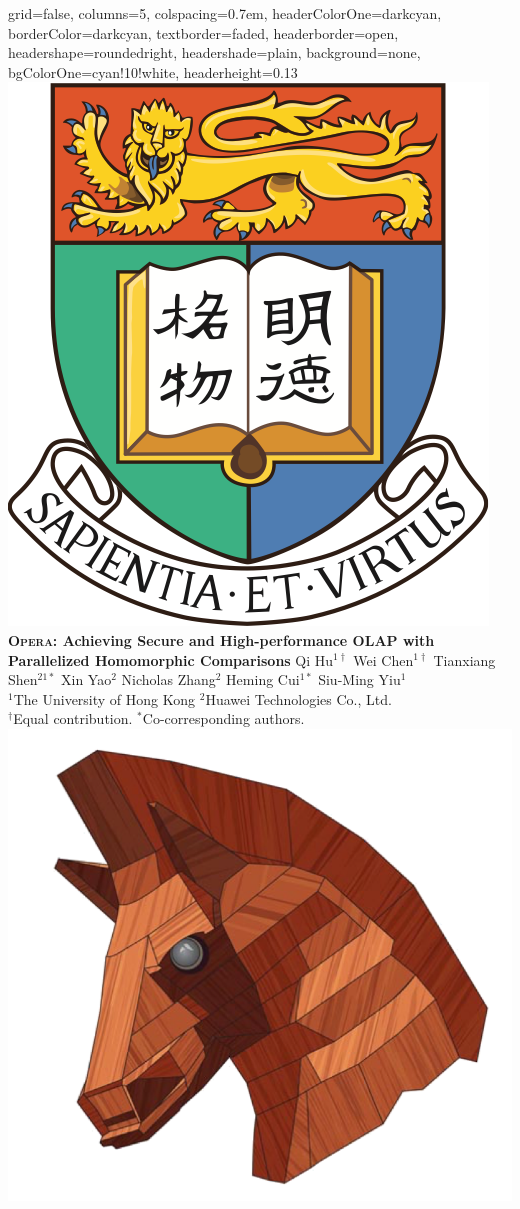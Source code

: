 \documentclass[landscape,a1paper,fontscale=0.42]{baposter}
\newcommand{\Sys}{\textsc{Opera}\xspace}
\begin{document}
\begin{poster}{
    grid=false,
    columns=5,
    colspacing=0.7em,
    headerColorOne=darkcyan,
    borderColor=darkcyan,
    textborder=faded,
    headerborder=open,
    headershape=roundedright,
    headershade=plain,
    background=none,
    bgColorOne=cyan!10!white,
    headerheight=0.13\textheight
}
{
    \makebox[0.01\textwidth]{}
    \includegraphics[width=0.05\linewidth]{logo/HKU_logo}
    \makebox[0.03\textwidth]{}
}
{
    \huge\bf \Sys{}: Achieving Secure and High-performance OLAP with Parallelized Homomorphic Comparisons
}
{
    \vspace{0.3em}
        Qi Hu$^{1\dagger}$ \enspace
        Wei Chen$^{1\dagger}$ \enspace
        Tianxiang Shen$^{21*}$ \enspace
        Xin Yao$^{2}$ \enspace
        Nicholas Zhang$^{2}$ \enspace
        Heming Cui$^{1*}$ \enspace
        Siu-Ming Yiu$^{1}$ \\
    {$^{1}$The University of Hong Kong \enspace$^{2}$Huawei Technologies Co., Ltd.} \\
    {\normalsize $^\dagger$Equal contribution. $^*$Co-corresponding authors.}
}
{
    \includegraphics[width=0.08\linewidth]{logo/trojan.png}
    \makebox[0.01\textwidth]{}
}



\end{poster}
\end{document}
